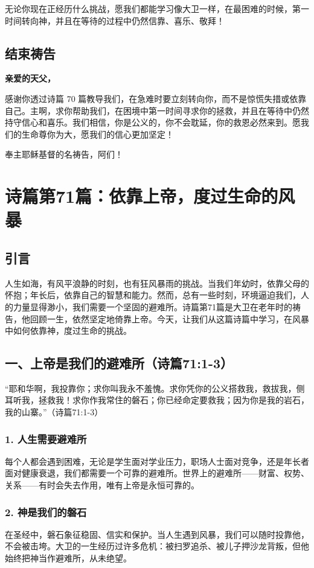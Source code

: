 \documentclass[a4paper, 12pt]{article}
\begin{document}
无论你现在正经历什么挑战，愿我们都能学习像大卫一样，在最困难的时候，第一时间转向神，并且在等待的过程中仍然信靠、喜乐、敬拜！

\subsection*{结束祷告}
\textbf{亲爱的天父，}

感谢你透过诗篇 70 篇教导我们，在急难时要立刻转向你，而不是惊慌失措或依靠自己。主啊，求你帮助我们，在困境中第一时间寻求你的拯救，并且在等待中仍然持守信心和喜乐。我们相信，你是公义的，你不会耽延，你的救恩必然来到。愿我们的生命尊你为大，愿我们的信心更加坚定！

奉主耶稣基督的名祷告，阿们！
\newpage
\section{诗篇第71篇：依靠上帝，度过生命的风暴}
\subsection*{引言}
人生如海，有风平浪静的时刻，也有狂风暴雨的挑战。当我们年幼时，依靠父母的怀抱；年长后，依靠自己的智慧和能力。然而，总有一些时刻，环境逼迫我们，人的力量显得渺小，我们需要一个坚固的避难所。诗篇第71篇是大卫在老年时的祷告，他回顾一生，依然坚定地倚靠上帝。今天，让我们从这篇诗篇中学习，在风暴中如何依靠神，度过生命的挑战。
\subsection*{一、上帝是我们的避难所（诗篇71:1-3）}
“耶和华啊，我投靠你；求你叫我永不羞愧。求你凭你的公义搭救我，救拔我，侧耳听我，拯救我！求你作我常住的磐石；你已经命定要救我；因为你是我的岩石，我的山寨。”（诗篇71:1-3）
\subsubsection*{1. 人生需要避难所}
每个人都会遇到困难，无论是学生面对学业压力，职场人士面对竞争，还是年长者面对健康衰退，我们都需要一个可靠的避难所。世界上的避难所——财富、权势、关系——有时会失去作用，唯有上帝是永恒可靠的。
\subsubsection*{2. 神是我们的磐石}
在圣经中，磐石象征稳固、信实和保护。当人生遇到风暴，我们可以随时投靠他，不会被击垮。大卫的一生经历过许多危机：被扫罗追杀、被儿子押沙龙背叛，但他始终把神当作避难所，从未绝望。
\end{document}
